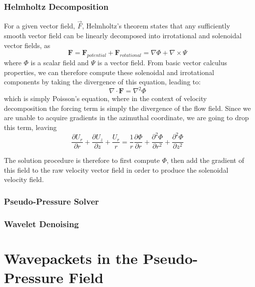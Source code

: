 \subsubsection{Helmholtz Decomposition}
	For a given vector field, $\vec{F}$, Helmholtz's theorem states that any sufficiently smooth vector field can be linearly decomposed into irrotational and solenoidal vector fields, as
	\begin{equation}
	\mathbf{F} = \mathbf{F}_{potential} + \mathbf{F}_{rotational} = \nabla \Phi + \nabla \times \Psi
	\end{equation}
	where $\Phi$ is a scalar field and $\Psi$ is a vector field.
	From basic vector calculus properties, we can therefore compute these solenoidal and irrotational components by taking the divergence of this equation, leading to:
	\begin{equation}
	\nabla \cdot \mathbf{F} = \nabla^{2} \Phi
	\end{equation}
	which is simply Poisson's equation, where in the context of velocity decomposition the forcing term is simply the divergence of the flow field.
	Since we are unable to acquire gradients in the azimuthal coordinate, we are going to drop this term, leaving
	\begin{equation}
	\frac{\partial U_r}{\partial r} + \frac{\partial U_z}{\partial z} + \frac{U_r}{r} = \frac{1}{r} \frac{\partial \Phi}{\partial r} + \frac{\partial^2 \Phi}{\partial r^2} + \frac{\partial^2 \Phi}{\partial z^2} 
	\end{equation}
	
	The solution procedure is therefore to first compute $\Phi$, then add the gradient of this field to the raw velocity vector field in order to produce the solenoidal velocity field.
\subsubsection{Pseudo-Pressure Solver}
\subsubsection{Wavelet Denoising}
\section{Wavepackets in the Pseudo-Pressure Field}